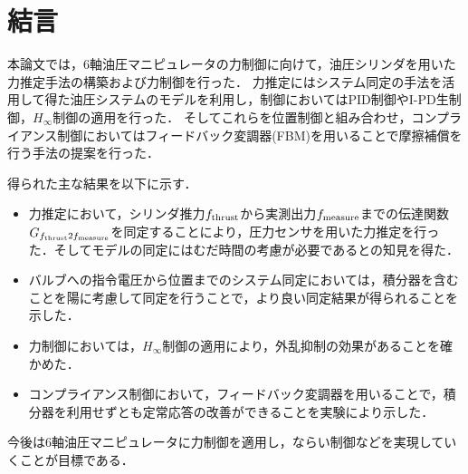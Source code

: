 \chapter{結言}
本論文では，6軸油圧マニピュレータの力制御に向けて，油圧シリンダを用いた力推定手法の構築および力制御を行った．
力推定にはシステム同定の手法を活用して得た油圧システムのモデルを利用し，制御においてはPID制御やI-PD生制御，$H_\infty$制御の適用を行った．
そしてこれらを位置制御と組み合わせ，コンプライアンス制御においてはフィードバック変調器(FBM)を用いることで摩擦補償を行う手法の提案を行った．

得られた主な結果を以下に示す．
\begin{itemize}
    \item 力推定において，シリンダ推力$f_\mathrm{thrust}$から実測出力$f_\mathrm{measure}$までの伝達関数$G_{f_\mathrm{thrust}2f_\mathrm{measure}}$を同定することにより，圧力センサを用いた力推定を行った．そしてモデルの同定にはむだ時間の考慮が必要であるとの知見を得た．
    \item バルブへの指令電圧から位置までのシステム同定においては，積分器を含むことを陽に考慮して同定を行うことで，より良い同定結果が得られることを示した．
    \item 力制御においては，$H_\infty$制御の適用により，外乱抑制の効果があることを確かめた．
    \item コンプライアンス制御において，フィードバック変調器を用いることで，積分器を利用せずとも定常応答の改善ができることを実験により示した．
\end{itemize}

今後は6軸油圧マニピュレータに力制御を適用し，ならい制御などを実現していくことが目標である．
